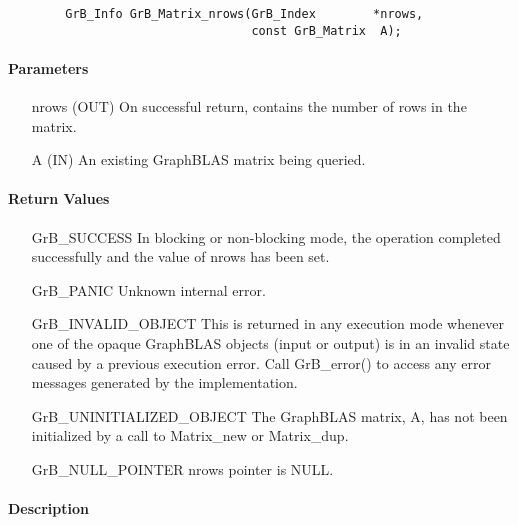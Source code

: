 \begin{verbatim}
        GrB_Info GrB_Matrix_nrows(GrB_Index        *nrows,
                                  const GrB_Matrix  A);
\end{verbatim}

\paragraph{Parameters}

\begin{itemize}[leftmargin=1.1in]
    \item[{\sf nrows}] ({\sf OUT}) On successful return, contains the number of rows in the matrix.
    \item[{\sf A}] ({\sf IN}) An existing GraphBLAS matrix being queried.
\end{itemize}


\paragraph{Return Values}

\begin{itemize}[leftmargin=2.1in]
    \item[{\sf GrB\_SUCCESS}]   In blocking or non-blocking mode, the operation 
    completed successfully and the value of {\sf nrows} has been set.

    \item[{\sf GrB\_PANIC}]     Unknown internal error.
    
    \item[{\sf GrB\_INVALID\_OBJECT}] This is returned in any execution mode 
    whenever one of the opaque GraphBLAS objects (input or output) is in an invalid 
    state caused by a previous execution error.  Call {\sf GrB\_error()} to access 
    any error messages generated by the implementation.

    \item[{\sf GrB\_UNINITIALIZED\_OBJECT}]  The GraphBLAS matrix, {\sf A}, has 
    not been initialized by a call to {\sf Matrix\_new} or {\sf Matrix\_dup}.
    
    \item[{\sf GrB\_NULL\_POINTER}]  {\sf nrows} pointer is {\sf NULL}.
\end{itemize}

\paragraph{Description}

